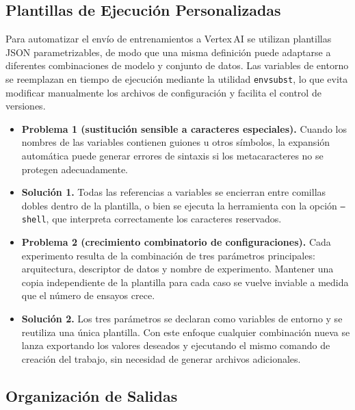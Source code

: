 \subsection{Plantillas de Ejecución Personalizadas}\label{ssec:job_templates}

Para automatizar el envío de entrenamientos a Vertex\,AI se utilizan plantillas JSON parametrizables, de modo que una misma definición puede adaptarse a diferentes combinaciones de modelo y conjunto de datos.
Las variables de entorno se reemplazan en tiempo de ejecución mediante la utilidad \texttt{envsubst}, lo que evita modificar manualmente los archivos de configuración y facilita el control de versiones.

\begin{itemize}
  \item \textbf{Problema 1 (sustitución sensible a caracteres especiales).}
        Cuando los nombres de las variables contienen guiones u otros símbolos, la expansión automática puede generar errores de sintaxis si los metacaracteres no se protegen adecuadamente.

  \item \textbf{Solución 1.}
        Todas las referencias a variables se encierran entre comillas dobles dentro de la plantilla, o bien se ejecuta la herramienta con la opción \texttt{--shell}, que interpreta correctamente los caracteres reservados.

  \item \textbf{Problema 2 (crecimiento combinatorio de configuraciones).}
        Cada experimento resulta de la combinación de tres parámetros principales: arquitectura, descriptor de datos y nombre de experimento.
        Mantener una copia independiente de la plantilla para cada caso se vuelve inviable a medida que el número de ensayos crece.

  \item \textbf{Solución 2.}
        Los tres parámetros se declaran como variables de entorno y se reutiliza una única plantilla.
        Con este enfoque cualquier combinación nueva se lanza exportando los valores deseados y ejecutando el mismo comando de creación del trabajo, sin necesidad de generar archivos adicionales.
\end{itemize}

\subsection{Organización de Salidas}\label{ssec:dirs}

